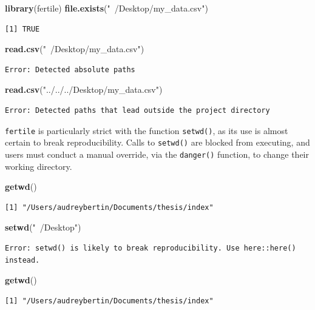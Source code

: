 \documentclass[12pt,twoside]{reedthesis}
\newenvironment{Shaded}{\begin{snugshade}}{\end{snugshade}}
\newcommand{\KeywordTok}[1]{\textcolor[rgb]{0.13,0.29,0.53}{\textbf{#1}}}
\newcommand{\StringTok}[1]{\textcolor[rgb]{0.31,0.60,0.02}{#1}}
\newcommand{\NormalTok}[1]{#1}
\begin{document}
\footnotesize
\begin{Shaded}
\begin{Highlighting}[]
\KeywordTok{library}\NormalTok{(fertile)}
\KeywordTok{file.exists}\NormalTok{(}\StringTok{"~/Desktop/my_data.csv"}\NormalTok{)}
\end{Highlighting}
\end{Shaded}
\begin{verbatim}
[1] TRUE
\end{verbatim}
\begin{Shaded}
\begin{Highlighting}[]
\KeywordTok{read.csv}\NormalTok{(}\StringTok{"~/Desktop/my_data.csv"}\NormalTok{)}
\end{Highlighting}
\end{Shaded}
\begin{verbatim}
Error: Detected absolute paths
\end{verbatim}
\begin{Shaded}
\begin{Highlighting}[]
\KeywordTok{read.csv}\NormalTok{(}\StringTok{"../../../Desktop/my_data.csv"}\NormalTok{)}
\end{Highlighting}
\end{Shaded}
\begin{verbatim}
Error: Detected paths that lead outside the project directory
\end{verbatim}
\normalsize

\texttt{fertile} is particularly strict with the function
\texttt{setwd()}, as its use is almost certain to break reproducibility.
Calls to \texttt{setwd()} are blocked from executing, and users must
conduct a manual override, via the \texttt{danger()} function, to change
their working directory.

\footnotesize
\begin{Shaded}
\begin{Highlighting}[]
\KeywordTok{getwd}\NormalTok{()}
\end{Highlighting}
\end{Shaded}
\begin{verbatim}
[1] "/Users/audreybertin/Documents/thesis/index"
\end{verbatim}
\begin{Shaded}
\begin{Highlighting}[]
\KeywordTok{setwd}\NormalTok{(}\StringTok{"~/Desktop"}\NormalTok{)}
\end{Highlighting}
\end{Shaded}
\begin{verbatim}
Error: setwd() is likely to break reproducibility. Use here::here() instead.
\end{verbatim}
\begin{Shaded}
\begin{Highlighting}[]
\KeywordTok{getwd}\NormalTok{()}
\end{Highlighting}
\end{Shaded}
\begin{verbatim}
[1] "/Users/audreybertin/Documents/thesis/index"
\end{verbatim}
\normalsize
\end{document}
